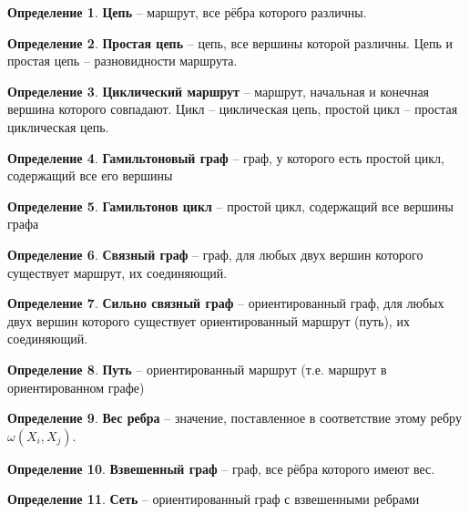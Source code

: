 \documentclass[12pt, a4paper, oneside]{article}
\theoremstyle{plain} %
\theoremstyle{definition}
\newtheorem*{definition}{Определение}  %
\newcommand{\indef}[1]{\textbf{ \color{dark_red} #1}}
\begin{document}
\begin{definition}
\indef{Цепь} – маршрут, все рёбра которого различны.
\end{definition}

\begin{definition}
\indef{Простая цепь} – цепь, все вершины которой различны.
Цепь и простая цепь – разновидности маршрута.
\end{definition}

\begin{definition}
\indef{Циклический маршрут} – маршрут, начальная и конечная вершина которого совпадают. Цикл – циклическая цепь, простой цикл – простая циклическая цепь.
\end{definition}

\begin{definition}
\indef{Гамильтоновый граф} – граф, у которого есть простой цикл, содержащий все его вершины
\end{definition}

\begin{definition}
\indef{Гамильтонов цикл} – простой цикл, содержащий все вершины графа
\end{definition}

\begin{definition}
\indef{Связный граф} – граф, для любых двух вершин которого существует маршрут, их соединяющий.
\end{definition}

\begin{definition}
\indef{Сильно связный граф} – ориентированный граф, для любых двух вершин которого существует ориентированный маршрут (путь), их соединяющий.
\end{definition}

\begin{definition}
\indef{Путь} – ориентированный маршрут (т.е. маршрут в ориентированном графе)
\end{definition}

\begin{definition}
\indef{Вес ребра} – значение, поставленное в соответствие этому ребру $\omega(X_i,X_j)$.
\end{definition}

\begin{definition}
\indef{Взвешенный граф} – граф, все рёбра которого имеют вес.
\end{definition}

\begin{definition}
\indef{Сеть} – ориентированный граф с взвешенными ребрами
\end{definition}
\end{document}
